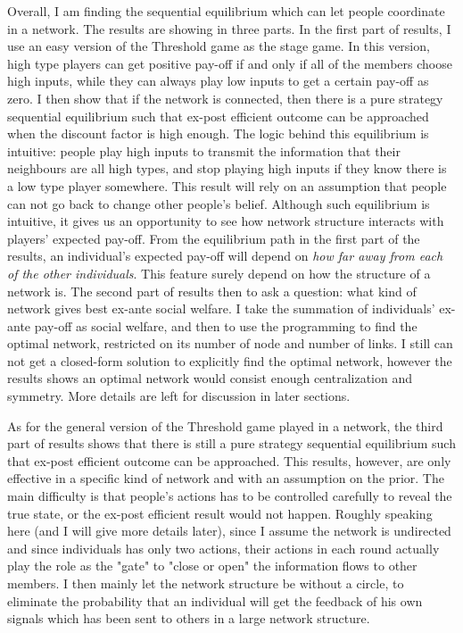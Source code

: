 \documentclass[12pt,letter]{article}
\theoremstyle{remark}
\theoremstyle{remark}
\theoremstyle{claim}
\begin{document}
Overall, I am finding the sequential equilibrium which can let people coordinate in a network. The results are showing in three parts. In the first part of results, I use an easy version of the Threshold game as the stage game. In this version, high type players can get positive pay-off if and only if all of the members choose high inputs, while they can always play low inputs to get a certain pay-off as zero. I then show that if the network is connected, then there is a pure strategy sequential equilibrium such that ex-post efficient outcome can be approached when the discount factor is high enough. The logic behind this equilibrium is intuitive: people play high inputs to transmit the information that their neighbours are all high types, and stop playing high inputs if they know there is a low type player somewhere. This result will rely on an assumption that people can not go back to change other people's belief. Although such equilibrium is intuitive, it gives us an opportunity to see how network structure interacts with players' expected pay-off. From the equilibrium path in the first part of the results, an individual's expected pay-off will depend on \textit{how far away from each of the other individuals}. This feature surely depend on how the structure of a network is. The second part of results then to ask a question: what kind of network gives best ex-ante social welfare. I take the summation of individuals' ex-ante pay-off as social welfare, and then to use the programming to find the optimal network, restricted on its number of node and number of links. I still can not get a closed-form solution to explicitly find the optimal network, however the results shows an optimal network would consist enough centralization and symmetry. More details are left for discussion in later sections.  

As for the general version of the Threshold game played in a network, the third part of results shows that there is still a pure strategy sequential equilibrium such that ex-post efficient outcome can be approached. This results, however, are only effective in a specific kind of network and with an assumption on the prior. The main difficulty is that people's actions has to be controlled carefully to reveal the true state, or the ex-post efficient result would not happen. Roughly speaking here (and I will give more details later), since I assume the network is undirected and since individuals has only two actions, their actions in each round actually play the role as the "gate" to "close or open" the information flows to other members. I then mainly let the network structure be without a circle,  to eliminate the probability that an individual will get the feedback of his own signals which has been sent to others in a large network structure. 
\end{document}
